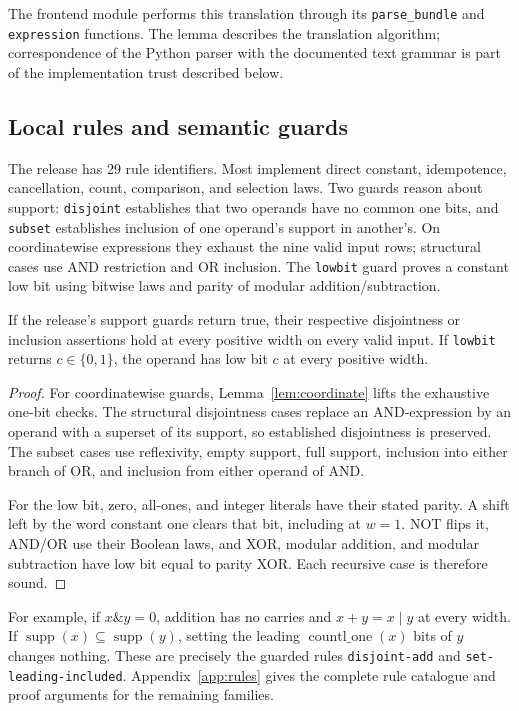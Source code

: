 The frontend module performs this translation through its \texttt{parse\_bundle} and \texttt{expression} functions. The lemma describes the translation algorithm; correspondence of the Python parser with the documented text grammar is part of the implementation trust described below.

\subsection{Local rules and semantic guards}
The release has 29 rule identifiers. Most implement direct constant, idempotence, cancellation, count, comparison, and selection laws. Two guards reason about support: \texttt{disjoint} establishes that two operands have no common one bits, and \texttt{subset} establishes inclusion of one operand's support in another's. On coordinatewise expressions they exhaust the nine valid input rows; structural cases use AND restriction and OR inclusion. The \texttt{lowbit} guard proves a constant low bit using bitwise laws and parity of modular addition/subtraction.

\begin{lemma}\label{lem:guards}
If the release's support guards return true, their respective disjointness or inclusion assertions hold at every positive width on every valid input. If \texttt{lowbit} returns $c\in\{0,1\}$, the operand has low bit $c$ at every positive width.
\end{lemma}
\begin{proof}
For coordinatewise guards, Lemma~\ref{lem:coordinate} lifts the exhaustive one-bit checks. The structural disjointness cases replace an AND-expression by an operand with a superset of its support, so established disjointness is preserved. The subset cases use reflexivity, empty support, full support, inclusion into either branch of OR, and inclusion from either operand of AND.

For the low bit, zero, all-ones, and integer literals have their stated parity. A shift left by the word constant one clears that bit, including at $w=1$. NOT flips it, AND/OR use their Boolean laws, and XOR, modular addition, and modular subtraction have low bit equal to parity XOR. Each recursive case is therefore sound.
\end{proof}

For example, if $x\mathbin{\&}y=0$, addition has no carries and $x+y=x\mathbin{|}y$ at every width. If $\operatorname{supp}(x)\subseteq\operatorname{supp}(y)$, setting the leading $\operatorname{countl\_one}(x)$ bits of $y$ changes nothing. These are precisely the guarded rules \texttt{disjoint-add} and \texttt{set-leading-included}. Appendix~\ref{app:rules} gives the complete rule catalogue and proof arguments for the remaining families.

